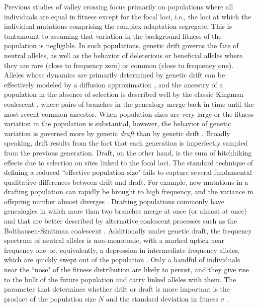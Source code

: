 \documentclass[10pt,twocolumn,twoside]{gsajnl}
\begin{document}
\begin{spacing}{1.5}
Previous studies of valley crossing focus primarily on populations where all individuals are equal in fitness except for the focal loci, i.e., the loci at which the individual mutations comprising the complex adaptation segregate.
This is tantamount to assuming that variation in the background fitness of the population is negligible.
In such populations, genetic drift governs the fate of neutral alleles, as well as the behavior of deleterious or beneficial alleles where they are rare (close to frequency zero) or common (close to frequency one).
Alleles whose dynamics are primarily determined by genetic drift can be effectively modeled by a diffusion approximation \citep{Wright:1945,Kimura:1955,Kimura:1957}, and the ancestry of a population in the absence of selection is described well by the classic Kingman coalescent \citep{Kingman:1982}, where pairs of branches in the genealogy merge back in time until the most recent common ancestor.
When population sizes are very large or the fitness variation in the population is substantial, however, the behavior of genetic variation is governed more by genetic \emph{draft} than by genetic drift \citep{gillespie_2000, gillespie_2001, masel_2011, neher_shraiman_2011}.
Broadly speaking, drift results from the fact that each generation is imperfectly sampled from the previous generation.
Draft, on the other hand, is the sum of hitchhiking effects due to selection on sites linked to the focal loci.
The standard technique of defining a reduced ``effective population size" fails to capture several fundamental qualitative differences between drift and draft.
For example, new mutations in a drafting population can rapidly be brought to high frequency, and the variance in offspring number almost diverges \citep{neher_shraiman_2011}.
Drafting populations commonly have genealogies in which more than two branches merge at once (or almost at once) and that are better described by alternative coalescent processes such as the Bolthausen-Sznitman coalescent \citep{neher_hallatschek_2013, brunet_2007, schweinsberg_2017}.
Additionally under genetic draft, the frequency spectrum of neutral alleles is non-monotonic, with a marked uptick near frequency one--or, equivalently, a depression in intermediate frequency alleles, which are quickly swept out of the population \citep{neher_shraiman_2011,kosheleva_2013,neher_hallatschek_2013}.
Only a handful of individuals near the ``nose" of the fitness distribution are likely to persist, and they give rise to the bulk of the future population and carry linked alleles with them.
The parameter that determines whether drift or draft is more important is the product of the population size $N$ and the standard deviation in fitness $\sigma$ \citep{neher_hallatschek_2013}.


\end{spacing}
\end{document}
